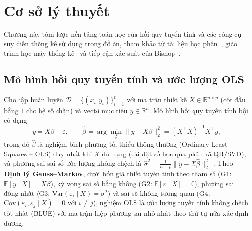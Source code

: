 \section{Cơ sở lý thuyết}
\label{sec:theory}

Chương này tóm lược nền tảng toán học của hồi quy tuyến tính và các công cụ suy diễn thống kê sử dụng trong đồ án, tham khảo từ tài liệu học phần~\cite{len2023phantichdulieu}, giáo trình học máy thống kê~\cite{james2021islr, hastie2009esl} và tiếp cận xác suất của Bishop~\cite{bishop2006prml}.

\subsection{Mô hình hồi quy tuyến tính và ước lượng OLS}
Cho tập huấn luyện $\mathcal{D} = \{(x_i, y_i)\}_{i=1}^{n}$ với ma trận thiết kế $X \in \mathbb{R}^{n \times p}$ (cột đầu bằng $1$ cho hệ số chặn) và vectơ mục tiêu $y \in \mathbb{R}^{n}$. Mô hình hồi quy tuyến tính bội có dạng
\begin{equation}
  y = X\beta + \varepsilon, \qquad
  \hat\beta = \arg\min_{\beta}\lVert y - X\beta \rVert_2^2 = (X^\top X)^{-1} X^\top y,
  \label{eq:ols}
\end{equation}
trong đó $\hat\beta$ là nghiệm bình phương tối thiểu thông thường (Ordinary Least Squares -- OLS) duy nhất khi $X$ đủ hạng (cài đặt số học qua phân rã QR/SVD), và phương sai sai số ước lượng không chệch là $\hat\sigma^2 = \frac{1}{n-p}\lVert y - X\hat\beta \rVert_2^2$~\cite{len2023phantichdulieu, james2021islr}. Theo \textbf{Định lý Gauss--Markov}, dưới bốn giả thiết tuyến tính theo tham số (G1: $\mathbb{E}[y \mid X] = X\beta$), kỳ vọng sai số bằng không (G2: $\mathbb{E}[\varepsilon \mid X] = 0$), phương sai đồng nhất (G3: $\mathrm{Var}(\varepsilon_i \mid X) = \sigma^2$) và sai số không tương quan (G4: $\mathrm{Cov}(\varepsilon_i, \varepsilon_j \mid X) = 0$ với $i \neq j$), nghiệm OLS là ước lượng tuyến tính không chệch tốt nhất (BLUE) với ma trận hiệp phương sai nhỏ nhất theo thứ tự nửa xác định dương.

